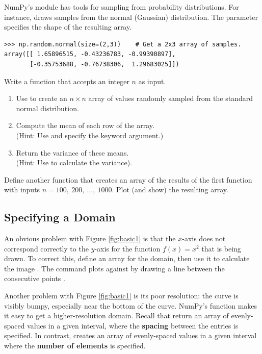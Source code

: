 \begin{problem} %
NumPy's  module has tools for sampling from probability distributions.
For instance,  draws samples from the normal (Gaussian) distribution.
The  parameter specifies the shape of the resulting array.
\begin{lstlisting}
>>> np.random.normal(size=(2,3))    # Get a 2x3 array of samples.
array([[ 1.65896515, -0.43236783, -0.99390897],
       [-0.35753688, -0.76738306,  1.29683025]])
\end{lstlisting}
%
Write a function that accepts an integer $n$ as input.
\begin{enumerate}
\item Use  to create an $n\times n$ array of values randomly sampled from the standard normal distribution.
\item Compute the mean of each row of the array.
\\(Hint: Use  and specify the  keyword argument.)
\item Return the variance of these means.
\\(Hint: Use  to calculate the variance).
\end{enumerate}
Define another function that creates an array of the results of the first function with inputs $n = 100,\ 200,\ \ldots,\ 1000$.
Plot (and show) the resulting array.
\end{problem}

\subsection*{Specifying a Domain} %

An obvious problem with Figure \ref{fig:basic1} is that the $x$-axis does not correspond correctly to the $y$-axis for the function $f(x) = x^2$ that is being drawn.
To correct this, define an array  for the domain, then use it to calculate the image .
The command  plots  against  by drawing a line between the consecutive points .

Another problem with Figure \ref{fig:basic1} is its poor resolution: the curve is visibly bumpy, especially near the bottom of the curve.
NumPy's  function makes it easy to get a higher-resolution domain.
Recall that  return an array of evenly-spaced values in a given interval, where the \textbf{spacing} between the entries is specified.
In contrast,  creates an array of evenly-spaced values in a given interval where the \textbf{number of elements} is specified.

